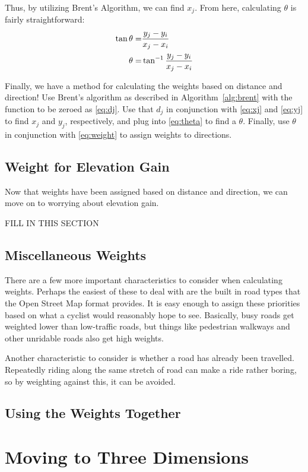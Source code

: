 \documentclass[twocolumn,11pt]{article}
\begin{document}
Thus, by utilizing Brent's Algorithm, we can find $x_j$. From here, calculating
$\theta$ is fairly straightforward:
\begin{align}
  \tan \theta = & \frac{y_j - y_i}{x_j-x_i} \notag \\
  \theta = & \tan^{-1} \frac{y_j - y_i}{x_j-x_i} \label{eq:theta}
\end{align}

Finally, we have a method for calculating the weights based on distance and
direction! Use Brent's algorithm as described in Algorithm~\ref{alg:brent}
with the function to be zeroed as \eqref{eq:dj}. Use that $d_j$ in conjunction
with \eqref{eq:xj} and \eqref{eq:yj} to find
$x_j$ and $y_j$, respectively, and plug into \eqref{eq:theta} to find a
$\theta$. Finally, use $\theta$ in conjunction with \eqref{eq:weight} to assign
weights to directions.

\subsection{Weight for Elevation Gain}

Now that weights have been assigned based on distance and direction, we can
move on to worrying about elevation gain.

FILL IN THIS SECTION

\subsection{Miscellaneous Weights}

There are a few more important characteristics to consider when calculating
weights. Perhaps the easiest of these to deal with are the built in road types
that the Open Street Map format provides. It is easy enough to assign these
priorities based on what a cyclist would reasonably hope to see. Basically,
busy roads get weighted lower than low-traffic roads, but things like
pedestrian walkways and other unridable roads also get high weights.

Another characteristic to consider is whether a road has already been
travelled. Repeatedly riding along the same stretch of road can make a ride
rather boring, so by weighting against this, it can be avoided.

\subsection{Using the Weights Together}

\section{Moving to Three Dimensions} \label{sec:latlong}
\end{document}
